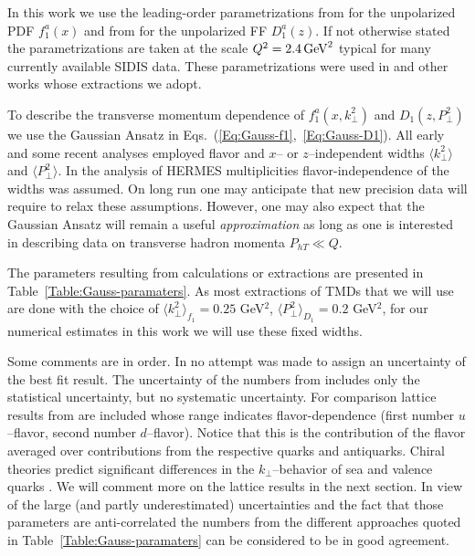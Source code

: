 \documentclass[a4paper,11pt]{article}
\newcommand{\la}{\langle}
\newcommand{\ra}{\rangle}
\def\Phperp{P_{hT}}
\def\kperp{k_\perp}
\def\pperp{P_\perp}
\def\avkperp{\la \kperp^2 \ra}
\def\avpperp{\la \pperp^2 \ra}
\begin{document}
In this work we use the leading-order parametrizations 
from \cite{Martin:2009iq} for the unpolarized PDF $f_1^a(x)$ and 
from \cite{deFlorian:2007aj} for the unpolarized FF $D_1^a(z)$.
If not otherwise stated the parametrizations are taken at the scale 
$Q^2=2.4\,{\rm GeV}^2$ typical for many currently available SIDIS data.
These parametrizations were used in \cite{Anselmino:2005nn} and other 
works whose extractions we adopt. 

To describe the transverse momentum dependence of $f_1^a(x,k_\perp^2)$ 
and $D_1(z,P_\perp^2)$ we use the Gaussian Ansatz in 
Eqs.~(\ref{Eq:Gauss-f1},~\ref{Eq:Gauss-D1}). All early 
\cite{Anselmino:2005nn,Collins:2005ie,D'Alesio:2007jt,Schweitzer:2010tt}
and some recent \cite{Signori:2013mda} analyses employed flavor and 
$x$-- or $z$--independent widths $\avkperp$ and $\avpperp$.
In the analysis \cite{Anselmino:2013lza} 
of HERMES multiplicities flavor-independence of the widths was 
assumed. On long run one may anticipate that new precision data will 
require to relax these assumptions. However, one may also expect that the 
Gaussian Ansatz will remain a useful {\it approximation} as long as one is 
interested in describing data on transverse hadron momenta $\Phperp \ll Q $. 

The parameters resulting from calculations or extractions are presented in
Table~\ref{Table:Gauss-paramaters}. 
As most extractions of TMDs that we will use are done with the choice of 
$\avkperp_{f_1} = 0.25$ GeV$^2$, $\avpperp_{D_1}= 0.2$ GeV$^2$, for our numerical estimates in this work  we will use these fixed widths.

Some comments are in order.
In \cite{Anselmino:2005nn} no attempt was made to assign an uncertainty of the 
best fit result. The uncertainty of the numbers from \cite{Schweitzer:2010tt}
includes only the statistical uncertainty, but no systematic uncertainty.
For comparison lattice results from \cite{Hagler:2009mb} are included
whose range indicates flavor-dependence 
(first number $u$--flavor,
second number $d$--flavor). 
Notice that this is the contribution of the flavor averaged
over contributions from the respective quarks and antiquarks.
Chiral theories predict significant differences in the $\kperp$--behavior
of sea and valence quarks \cite{Schweitzer:2012hh}.
We will comment more on the lattice results in the next section.
In view of the large (and partly underestimated) uncertainties and the 
fact that those parameters are anti-correlated the numbers from the 
different approaches quoted in Table~\ref{Table:Gauss-paramaters} 
can be considered to be in good agreement. 
\end{document}
